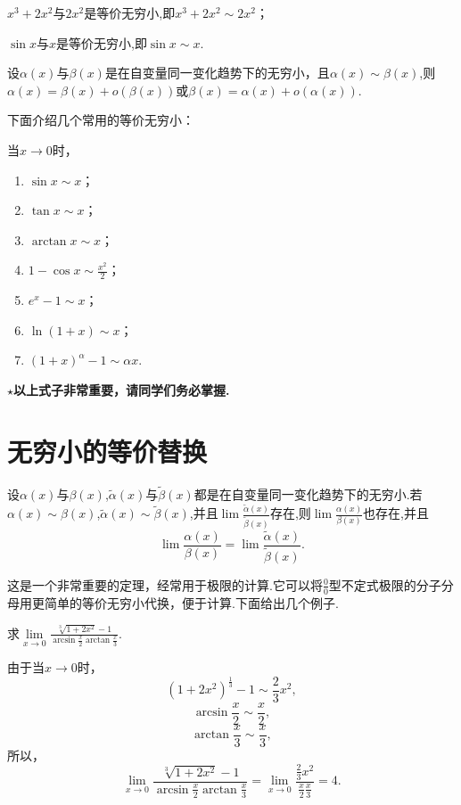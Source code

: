 	$x^3+2x^2$与$2x^2$是等价无穷小,即$x^3+2x^2 \sim 2x^2$；
	
	$\sin{x}$与$x$是等价无穷小,即$\sin{x}\sim x$.
	
	\begin{theorem}
		设$\alpha(x)$与$\beta(x)$是在自变量同一变化趋势下的无穷小，且$\alpha(x)\sim \beta(x)$,则$\alpha(x)=\beta(x)+o(\beta(x))$或$\beta(x)=\alpha(x)+o(\alpha(x)).$
	\end{theorem}
	下面介绍几个常用的等价无穷小：
	
	当$x\to 0$时，
	\begin{enumerate}
		\item $\sin{x}\sim x$；
		\item $\tan{x}\sim x$；
		\item $\arctan{x}\sim x$；
		\item $1-\cos{x}\sim \frac{x^2}{2}$；
		\item $e^x-1\sim x$；
		\item $\ln{(1+x)}\sim x$；
		\item $(1+x)^{\alpha }-1\sim \alpha x$.
	\end{enumerate}
	\textbf{$\star$以上式子非常重要，请同学们务必掌握.}

	\section{无穷小的等价替换}
	\begin{theorem}[无穷小等价代换定理]
		设$\alpha(x)$与$\beta(x)$,$\tilde{\alpha}(x)$与$\tilde{\beta}(x)$都是在自变量同一变化趋势下的无穷小.若$\alpha(x)\sim \beta(x)$,$\tilde{\alpha}(x)\sim \tilde{\beta}(x)$,并且$\lim\limits_{}\frac{\tilde{\alpha}(x)}{\tilde{\beta}(x)}$存在,则$\lim\limits_{}\frac{\alpha(x)}{\beta(x)}$也存在,并且
			\[
			\lim\frac{\alpha(x)}{\beta(x)}=\lim\frac{\tilde{\alpha}(x)}{\tilde{\beta}(x)}.
			\]
	\end{theorem}

	这是一个非常重要的定理，经常用于极限的计算.它可以将$\frac{0}{0}$型不定式极限的分子分母用更简单的等价无穷小代换，便于计算.下面给出几个例子.
	
	\begin{example}
		求$\lim\limits_{x\to 0}\frac{\sqrt[3]{1+2x^2}-1}{\arcsin\frac{x}{2}\arctan\frac{x}{3}}$.
	\end{example}
	\begin{solution}
		由于当$x\to 0$时，
		\[
		(1+2x^2)^{\frac{1}{3} }-1\sim \frac{2}{3}x^2,
		\]
		\[
		\arcsin\frac{x}{2}\sim \frac{x}{2},
		\]
		\[
		\arctan\frac{x}{3}\sim \frac{x}{3},
		\]
		所以，
		\[
		\lim_{x\to 0}\frac{\sqrt[3]{1+2x^2}-1}{\arcsin\frac{x}{2}\arctan\frac{x}{3}}=\lim_{x\to 0}\frac{\frac{2}{3}x^2}{\frac{x}{2}\frac{x}{3}}=4.
		\]
	\end{solution}

